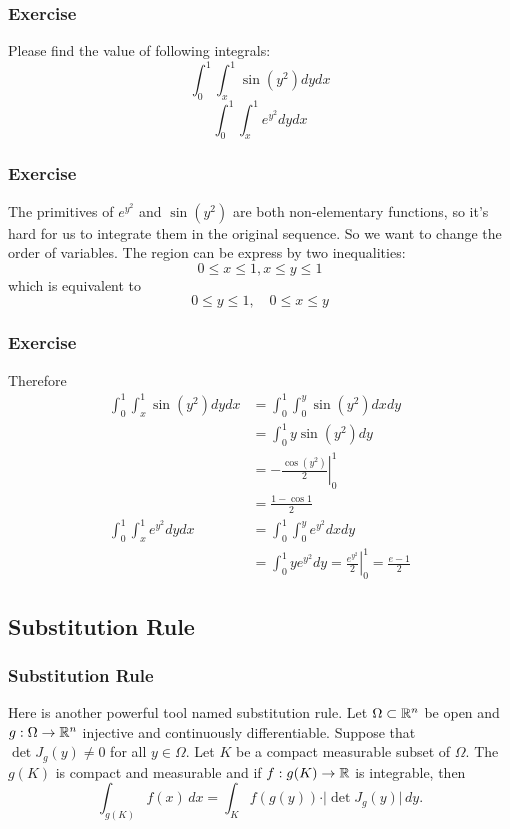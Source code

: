 \documentclass[12pt, t]{beamer}
\begin{document}
\begin{frame}
    \frametitle{Exercise}
    Please find the value of following integrals:
    $$\int_{0}^{1} \int_{x}^{1} \sin \left(y^{2}\right) d y d x$$
    $$\int_{0}^{1} \int_{x}^{1} e^{y^{2}} d y d x$$
\end{frame}

\begin{frame}
    \frametitle{Exercise}
    The primitives of $e^{y^{2}}$ and $\sin \left(y^{2}\right)$ are both non-elementary functions, so it's hard for us to integrate them in the original sequence. So we want to change the order of variables. The region can be express by two inequalities:
    \[
        0 \leq x \leq 1, x \leq y \leq 1
    \]
    which is equivalent to
    \[
        0 \leq y \leq 1, \quad 0 \leq x \leq y
    \]
\end{frame}

\begin{frame}
    \frametitle{Exercise}
    Therefore
    \[
        \begin{aligned}
            \int_{0}^{1} \int_{x}^{1} \sin \left(y^{2}\right) d y d x & =\int_{0}^{1} \int_{0}^{y} \sin \left(y^{2}\right) d x d y                            \\
                                                                      & =\int_{0}^{1} y \sin \left(y^{2}\right) d y                                           \\&=               -\left.\frac{\cos \left(y^{2}\right)}{2}\right|_{0} ^{1}\\&=\frac{1-\cos 1}{2}          \\
            \int_{0}^{1} \int_{x}^{1} e^{y^{2}} d y d x               & =\int_{0}^{1} \int_{0}^{y} e^{y^{2}} d x d y                                          \\
                                                                      & =\int_{0}^{1} y e^{y^{2}} d y=\left.\frac{e^{y^{2}}}{2}\right|_{0} ^{1}=\frac{e-1}{2}
        \end{aligned}
    \]


\end{frame}

\subsection{Substitution Rule}
\begin{frame}
    \frametitle{Substitution Rule}
    Here is another powerful tool named substitution rule. Let $\Omega\subset\mathbb{R}^n$ be open and $g:\Omega\to\mathbb{R}^n$ injective and continuously dif{}ferentiable. Suppose that $\det J_g(y)\neq0$ for all $y\in\Omega$. Let $K$ be a compact measurable subset of $\Omega$. The $g(K)$ is compact and measurable and if $f:g(K)\to\mathbb{R}$ is integrable, then
    \[\int_{g(K)}f(x)\,dx=\int_Kf(g(y))\cdot
        \vert\det J_g(y)\vert\,dy.\]
\end{frame}
\end{document}
